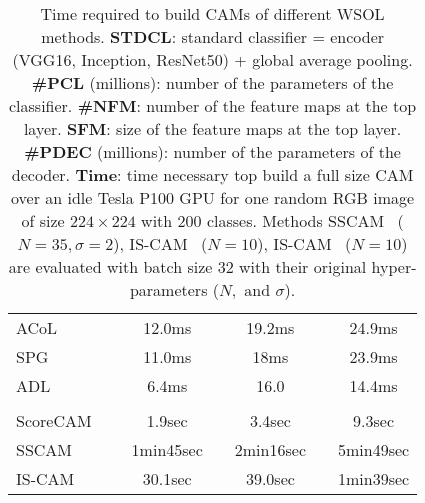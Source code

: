 \documentclass[twocolumn]{article}
\theoremstyle{definition}
\begin{document}
{\begin{table*}[ht!]
{\begin{tabular}{lc*{4}{c}c*{4}{c}c*{4}{c}}
\cline{1-1}\cline{3-6}\cline{8-11}\cline{13-16} \\
ACoL~\cite{ZhangWF0H18}  &  &                   \multicolumn{4}{c}{12.0ms}  && \multicolumn{4}{c}{19.2ms}  && \multicolumn{4}{c}{24.9ms} \\
SPG~\cite{ZhangWKYH18}  &  &                   \multicolumn{4}{c}{11.0ms}  && \multicolumn{4}{c}{18ms}  && \multicolumn{4}{c}{23.9ms} \\
ADL~\cite{ChoeS19}  &  &                   \multicolumn{4}{c}{6.4ms}  && \multicolumn{4}{c}{16.0}  && \multicolumn{4}{c}{14.4ms} \\
\cline{1-1}\cline{3-6}\cline{8-11}\cline{13-16} \\
ScoreCAM~\cite{WangWDYZDMH20scorecam}  &  &         \multicolumn{4}{c}{1.9sec}  && \multicolumn{4}{c}{3.4sec}  && \multicolumn{4}{c}{9.3sec} \\
SSCAM~\cite{naidu2020sscam}  &&\multicolumn{4}{c}{1min45sec} && \multicolumn{4}{c}{2min16sec}  &&\multicolumn{4}{c}{5min49sec} \\
IS-CAM~\cite{naidu2020iscam}  &  &  \multicolumn{4}{c}{30.1sec}  && \multicolumn{4}{c}{39.0sec}  && \multicolumn{4}{c}{1min39sec} \\
\end{tabular}
}
\caption{
Time required to build CAMs of different WSOL methods.
\textbf{STDCL}: standard classifier = encoder (VGG16, Inception, ResNet50) + global average pooling.
\textbf{\#PCL} (millions): number of the parameters of the classifier.
\textbf{\#NFM}: number of the feature maps at the top layer.
\textbf{SFM}: size of the feature maps at the top layer.
\textbf{\#PDEC} (millions): number of the parameters of the decoder.
\textbf{Time}: time necessary top build a full size CAM over an idle Tesla P100 GPU for one random RGB image of size ${224\times224}$ with ${200}$ classes.
Methods SSCAM~\cite{naidu2020sscam} (${N=35, \sigma=2}$), IS-CAM~\cite{naidu2020iscam} (${N=10}$), IS-CAM~\cite{naidu2020iscam} (${N=10}$) are evaluated with batch size 32 with their original hyper-parameters (${N, \text{ and } \sigma}$).
}
\label{tab:complexity}
\vspace{-1em}
\end{table*}
}
\end{document}
